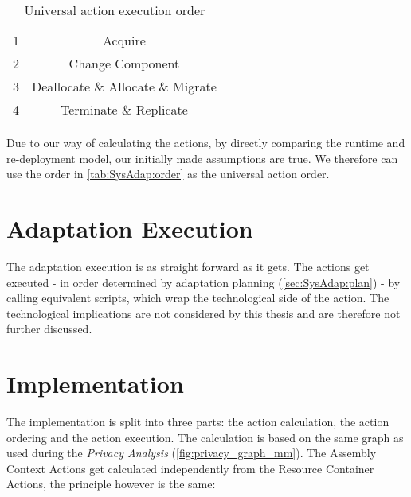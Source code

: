 \begin{table}[h]
	\centering
	\begin{tabular}{ r | c}
		\hline
		1 & Acquire\\
		2 & Change Component\\
		3 & Deallocate \& Allocate \& Migrate \\
		4 & Terminate \& Replicate\\
		\hline
	\end{tabular}
	\caption{Universal action execution order}
	\label{tab:SysAdap:order}
\end{table}

Due to our way of calculating the actions, by directly comparing the runtime and re-deployment model, our initially made assumptions are true. We therefore can use the order in \autoref{tab:SysAdap:order} as the universal action order.


\section{Adaptation Execution}
\label{sec:SysAdap:exec}

The adaptation execution is as straight forward as it gets. The actions get executed - in order determined by adaptation planning (\autoref{sec:SysAdap:plan}) - by calling equivalent scripts, which wrap the technological side of the action. The technological implications are not considered by this thesis and are therefore not further discussed.



\section{Implementation}
\label{sec:SysAdap:impl}


The implementation is split into three parts: the action calculation, the action ordering and the action execution. The calculation is based on the same graph as used during the \textit{Privacy Analysis} (\autoref{fig:privacy_graph_mm}). The Assembly Context Actions get calculated independently from the Resource Container Actions, the principle however is the same:

